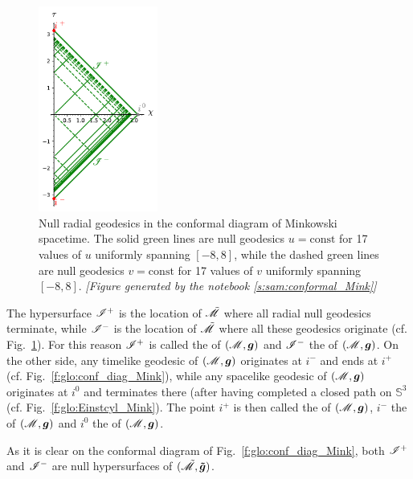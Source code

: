 \begin{figure}
\centerline{\includegraphics[width=0.35\textwidth]{glo_conf_Mink_null.pdf}}
\caption[]{\label{f:glo:conf_Mink_null}\footnotesize
Null radial geodesics in the conformal diagram of Minkowski spacetime.
The solid green lines are null geodesics $u=\mathrm{const}$ for
17 values of $u$ uniformly spanning $[-8,8]$, while the dashed green lines are
null geodesics $v=\mathrm{const}$ for 17 values of $v$ uniformly spanning $[-8,8]$.
\textsl{[Figure generated by the notebook \ref{s:sam:conformal_Mink}]}
}
\end{figure}

The hypersurface $\mathscr{I}^+$ is the location of $\tilde{\mathscr{M}}$ where all radial null geodesics
terminate, while $\mathscr{I}^-$ is the location of $\tilde{\mathscr{M}}$ where all these geodesics originate (cf. Fig.~\ref{f:glo:conf_Mink_null}). For this
reason $\mathscr{I}^+$ is called the
of $(\mathscr{M},\bm{g})$
and $\mathscr{I}^-$ the 
of $(\mathscr{M},\bm{g})$.
On the other side, any timelike geodesic of $(\mathscr{M},\bm{g})$ originates at $i^-$ and ends at
$i^+$ (cf. Fig.~\ref{f:glo:conf_diag_Mink}), while any spacelike geodesic
of $(\mathscr{M},\bm{g})$ originates at $i^0$ and terminates there
(after having completed a closed path on $\mathbb{S}^3$ (cf. Fig.~\ref{f:glo:Einstcyl_Mink}).
The point $i^+$ is then called the
of $(\mathscr{M},\bm{g})$,
$i^-$ the 
of $(\mathscr{M},\bm{g})$
and $i^0$ the  of $(\mathscr{M},\bm{g})$.

As it is clear on the conformal diagram of Fig.~\ref{f:glo:conf_diag_Mink},
both $\mathscr{I}^+$ and $\mathscr{I}^-$ are null hypersurfaces of $(\tilde{\mathscr{M}},\bm{\tilde{g}})$.

